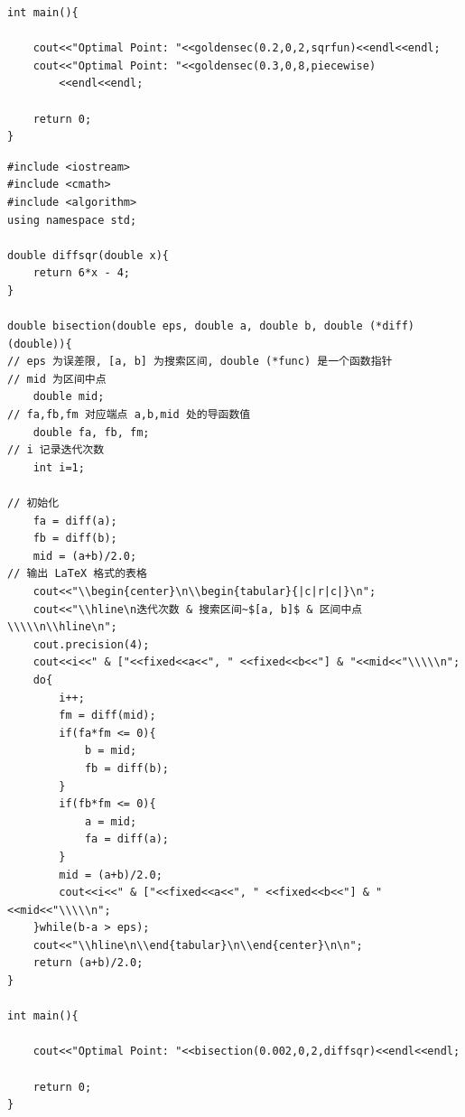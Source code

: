 \documentclass[a4paper,12pt]{article}
\begin{document}
\begin{CJK*}{UTF8}{gbsn}
\begin{lstlisting}[caption={黄金分割法}, label={goldensec}]
int main(){

    cout<<"Optimal Point: "<<goldensec(0.2,0,2,sqrfun)<<endl<<endl;
    cout<<"Optimal Point: "<<goldensec(0.3,0,8,piecewise)
        <<endl<<endl;

    return 0;
}

\end{lstlisting}

\begin{lstlisting}[caption={二分法}, label={bisec}]
#include <iostream>
#include <cmath>
#include <algorithm>
using namespace std;

double diffsqr(double x){
    return 6*x - 4;
}

double bisection(double eps, double a, double b, double (*diff)(double)){
// eps 为误差限, [a, b] 为搜索区间, double (*func) 是一个函数指针
// mid 为区间中点
    double mid;
// fa,fb,fm 对应端点 a,b,mid 处的导函数值
    double fa, fb, fm;
// i 记录迭代次数
    int i=1;

// 初始化
    fa = diff(a);
    fb = diff(b);
    mid = (a+b)/2.0;
// 输出 LaTeX 格式的表格
    cout<<"\\begin{center}\n\\begin{tabular}{|c|r|c|}\n";
    cout<<"\\hline\n迭代次数 & 搜索区间~$[a, b]$ & 区间中点\\\\\n\\hline\n";
    cout.precision(4);
    cout<<i<<" & ["<<fixed<<a<<", " <<fixed<<b<<"] & "<<mid<<"\\\\\n";
    do{
        i++;
        fm = diff(mid);
        if(fa*fm <= 0){
            b = mid;
            fb = diff(b);
        }
        if(fb*fm <= 0){
            a = mid;
            fa = diff(a);
        }
        mid = (a+b)/2.0;
        cout<<i<<" & ["<<fixed<<a<<", " <<fixed<<b<<"] & "<<mid<<"\\\\\n";
    }while(b-a > eps);
    cout<<"\\hline\n\\end{tabular}\n\\end{center}\n\n";
    return (a+b)/2.0;
}

int main(){

    cout<<"Optimal Point: "<<bisection(0.002,0,2,diffsqr)<<endl<<endl;

    return 0;
}

\end{lstlisting}


\end{CJK*}
\end{document}
